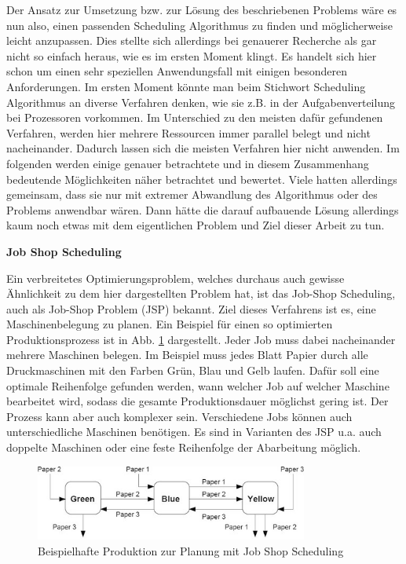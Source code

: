 Der Ansatz zur Umsetzung bzw. zur Lösung des beschriebenen Problems wäre es nun also, einen passenden Scheduling Algorithmus zu finden und möglicherweise leicht anzupassen. Dies stellte sich allerdings bei genauerer Recherche als gar nicht so einfach heraus, wie es im ersten Moment klingt. Es handelt sich hier schon um einen sehr speziellen Anwendungsfall mit einigen besonderen Anforderungen. Im ersten Moment könnte man beim Stichwort Scheduling Algorithmus an diverse Verfahren denken, wie sie z.B. in der Aufgabenverteilung bei Prozessoren vorkommen. Im Unterschied zu den meisten dafür gefundenen Verfahren, werden hier mehrere Ressourcen immer parallel belegt und nicht nacheinander. Dadurch lassen sich die meisten Verfahren hier nicht anwenden. Im folgenden werden einige genauer betrachtete und in diesem Zusammenhang bedeutende Möglichkeiten näher betrachtet und bewertet. Viele hatten allerdings gemeinsam, dass sie nur mit extremer Abwandlung des Algorithmus oder des Problems anwendbar wären. Dann hätte die darauf aufbauende Lösung allerdings kaum noch etwas mit dem eigentlichen Problem und Ziel dieser Arbeit zu tun.

\textbf{Job Shop Scheduling}

Ein verbreitetes Optimierungsproblem, welches durchaus auch gewisse Ähnlichkeit zu dem hier dargestellten Problem hat, ist das Job-Shop Scheduling, auch als Job-Shop Problem (JSP) bekannt. Ziel dieses Verfahrens ist es, eine Maschinenbelegung zu planen. Ein Beispiel für einen so optimierten Produktionsprozess ist in Abb. \ref{fig:job_shop_skizze} dargestellt. Jeder Job muss dabei nacheinander mehrere Maschinen belegen. Im Beispiel muss jedes Blatt Papier durch alle Druckmaschinen mit den Farben Grün, Blau und Gelb laufen. Dafür soll eine optimale Reihenfolge gefunden werden, wann welcher Job auf welcher Maschine bearbeitet wird, sodass die gesamte Produktionsdauer möglichst gering ist. Der Prozess kann aber auch komplexer sein. Verschiedene Jobs können auch unterschiedliche Maschinen benötigen. Es sind in Varianten des JSP u.a. auch doppelte Maschinen oder eine feste Reihenfolge der Abarbeitung möglich. \cite{jobshop1}

\begin{figure}[H]
    \centering
    \includegraphics[width=0.8\textwidth]{images/jobshopdiagram.jpg}
    \caption{Beispielhafte Produktion zur Planung mit Job Shop Scheduling \cite{jobshop2}}
    \label{fig:job_shop_skizze}
\end{figure}

